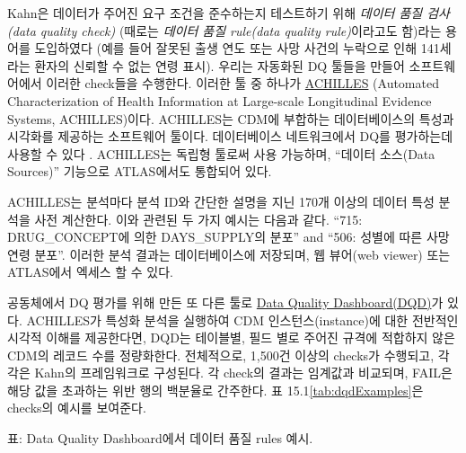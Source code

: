 \documentclass[11pt]{book}
\theoremstyle{definition}
\theoremstyle{definition}
\theoremstyle{definition}
\theoremstyle{remark}
\begin{document}
 

Kahn은 데이터가 주어진 요구 조건을 준수하는지 테스트하기 위해
\emph{데이터 품질 검사(data quality check)} (때로는 \emph{데이터 품질
rule(data quality rule)}이라고도 함)라는 용어를 도입하였다 (예를 들어
잘못된 출생 연도 또는 사망 사건의 누락으로 인해 141세라는 환자의 신뢰할
수 없는 연령 표시). 우리는 자동화된 DQ 툴들을 만들어 소프트웨어에서
이러한 check들을 수행한다. 이러한 툴 중 하나가
\href{https://github.com/OHDSI/Achilles}{ACHILLES} (Automated
Characterization of Health Information at Large-scale Longitudinal
Evidence Systems, ACHILLES)이다. \citep{huser_methods_2018} ACHILLES는
CDM에 부합하는 데이터베이스의 특성과 시각화를 제공하는 소프트웨어
툴이다. 데이터베이스 네트워크에서 DQ를 평가하는데 사용할 수 있다
\citep{huser_multisite_2016}. ACHILLES는 독립형 툴로써 사용 가능하며,
``데이터 소스(Data Sources)'' 기능으로 ATLAS에서도 통합되어 있다.
 

ACHILLES는 분석마다 분석 ID와 간단한 설명을 지닌 170개 이상의 데이터
특성 분석을 사전 계산한다. 이와 관련된 두 가지 예시는 다음과 같다.
``715: DRUG\_CONCEPT에 의한 DAYS\_SUPPLY의 분포'' and ``506: 성별에 따른
사망 연령 분포''. 이러한 분석 결과는 데이터베이스에 저장되며, 웹
뷰어(web viewer) 또는 ATLAS에서 엑세스 할 수 있다.


공동체에서 DQ 평가를 위해 만든 또 다른 툴로
\href{https://github.com/OHDSI/DataQualityDashboard}{Data Quality
Dashboard(DQD)}가 있다. ACHILLES가 특성화 분석을 실행하여 CDM
인스턴스(instance)에 대한 전반적인 시각적 이해를 제공한다면, DQD는
테이블별, 필드 별로 주어진 규격에 적합하지 않은 CDM의 레코드 수를
정량화한다. 전체적으로, 1,500건 이상의 checks가 수행되고, 각각은 Kahn의
프레임워크로 구성된다. 각 check의 결과는 임계값과 비교되며, FAIL은 해당
값을 초과하는 위반 행의 백분율로 간주한다. 표
15.1\ref{tab:dqdExamples}은 checks의 예시를 보여준다.

표: \label{tab:dqdExamples} Data Quality Dashboard에서 데이터 품질 rules
예시.
\end{document}
